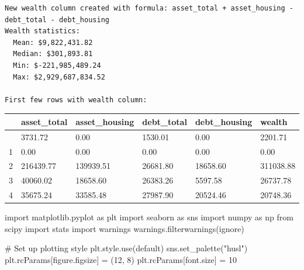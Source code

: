 \documentclass[
  letterpaper,
  DIV=11,
  numbers=noendperiod]{scrartcl}
\newenvironment{Shaded}{\begin{snugshade}}{\end{snugshade}}
\newcommand{\CommentTok}[1]{\textcolor[rgb]{0.37,0.37,0.37}{#1}}
\newcommand{\DecValTok}[1]{\textcolor[rgb]{0.68,0.00,0.00}{#1}}
\newcommand{\ImportTok}[1]{\textcolor[rgb]{0.00,0.46,0.62}{#1}}
\newcommand{\NormalTok}[1]{\textcolor[rgb]{0.00,0.23,0.31}{#1}}
\newcommand{\OperatorTok}[1]{\textcolor[rgb]{0.37,0.37,0.37}{#1}}
\newcommand{\StringTok}[1]{\textcolor[rgb]{0.13,0.47,0.30}{#1}}
\begin{document}
\begin{verbatim}
New wealth column created with formula: asset_total + asset_housing - debt_total - debt_housing
Wealth statistics:
  Mean: $9,822,431.82
  Median: $301,893.81
  Min: $-221,985,489.24
  Max: $2,929,687,834.52

First few rows with wealth column:
\end{verbatim}

\begin{longtable}[]{@{}llllll@{}}
\toprule\noalign{}
& asset\_total & asset\_housing & debt\_total & debt\_housing &
wealth \\
\midrule\noalign{}
\endhead
\bottomrule\noalign{}
\endlastfoot
0 & 3731.72 & 0.00 & 1530.01 & 0.00 & 2201.71 \\
1 & 0.00 & 0.00 & 0.00 & 0.00 & 0.00 \\
2 & 216439.77 & 139939.51 & 26681.80 & 18658.60 & 311038.88 \\
3 & 40060.02 & 18658.60 & 26383.26 & 5597.58 & 26737.78 \\
4 & 35675.24 & 33585.48 & 27987.90 & 20524.46 & 20748.36 \\
\end{longtable}

\begin{Shaded}
\begin{Highlighting}[]
\ImportTok{import}\NormalTok{ matplotlib.pyplot }\ImportTok{as}\NormalTok{ plt}
\ImportTok{import}\NormalTok{ seaborn }\ImportTok{as}\NormalTok{ sns}
\ImportTok{import}\NormalTok{ numpy }\ImportTok{as}\NormalTok{ np}
\ImportTok{from}\NormalTok{ scipy }\ImportTok{import}\NormalTok{ stats}
\ImportTok{import}\NormalTok{ warnings}
\NormalTok{warnings.filterwarnings(}\StringTok{\textquotesingle{}ignore\textquotesingle{}}\NormalTok{)}

\CommentTok{\# Set up plotting style}
\NormalTok{plt.style.use(}\StringTok{\textquotesingle{}default\textquotesingle{}}\NormalTok{)}
\NormalTok{sns.set\_palette(}\StringTok{"husl"}\NormalTok{)}
\NormalTok{plt.rcParams[}\StringTok{\textquotesingle{}figure.figsize\textquotesingle{}}\NormalTok{] }\OperatorTok{=}\NormalTok{ (}\DecValTok{12}\NormalTok{, }\DecValTok{8}\NormalTok{)}
\NormalTok{plt.rcParams[}\StringTok{\textquotesingle{}font.size\textquotesingle{}}\NormalTok{] }\OperatorTok{=} \DecValTok{10}
\end{Highlighting}
\end{Shaded}
\end{document}
